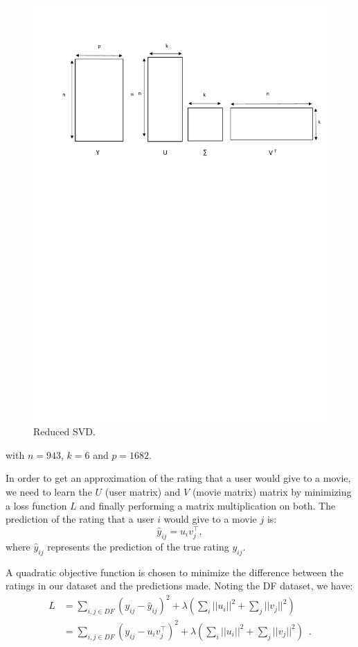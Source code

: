 \documentclass{article}
\begin{document}
\begin{figure}[H]
\centering
  \includegraphics[scale=0.5]{./images/svd.pdf}
  \caption{Reduced SVD.}
  \label{fig:svd}
\end{figure} 

with $n=943$, $k=6$ and $p=1682$.

In order to get an approximation of the rating that a user would give to a movie, we need to learn the $U$ (user matrix) and $V$ (movie matrix) matrix by minimizing a  loss function $L$ and finally performing a matrix multiplication on both.
The prediction of the rating that a user $i$ would give to a movie $j$
is:
\[ \hat{y}_{ij}=u_i v_j^{\top},\]
where $\hat{y}_{ij}$ represents the prediction of the true rating $y_{ij}$.

A quadratic objective function is chosen to minimize the difference between the ratings in our dataset and the predictions made.
Noting the DF dataset, we have:
\begin{align*}
   L&=\sum_{i,j \in DF} (y_{ij} - \hat{y}_{ij})^2 + \lambda\left(\sum_i || u_i ||^2 + \sum_j || v_j ||^2\right) \\
   &=\sum_{i,j \in DF} (y_{ij} - u_i v_j^{\top} )^2 + \lambda\left(\sum_i || u_i ||^2 + \sum_j || v_j ||^2\right) \enspace .
\end{align*}
\end{document}
